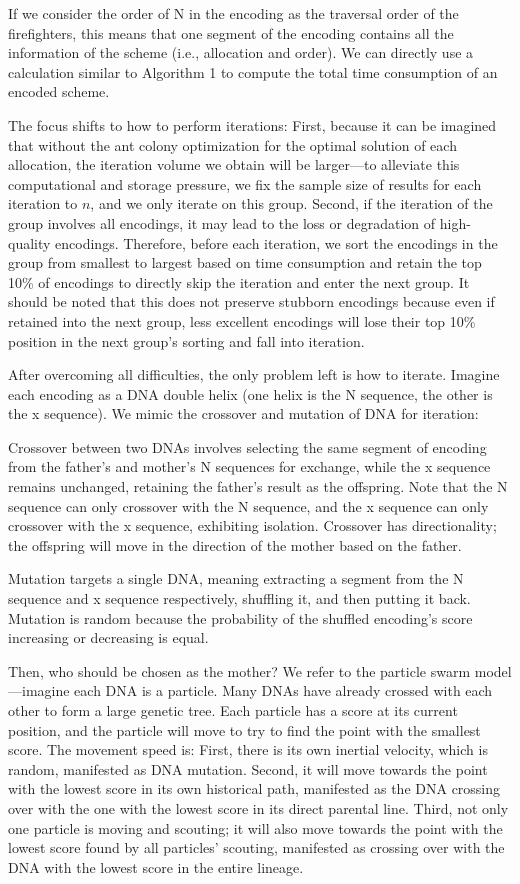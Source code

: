 If we consider the order of N in the encoding as the traversal order of the firefighters, this means that one segment of the encoding contains all the information of the scheme (i.e., allocation and order). We can directly use a calculation similar to Algorithm 1 to compute the total time consumption of an encoded scheme.  

The focus shifts to how to perform iterations: First, because it can be imagined that without the ant colony optimization for the optimal solution of each allocation, the iteration volume we obtain will be larger---to alleviate this computational and storage pressure, we fix the sample size of results for each iteration to $n$, and we only iterate on this group. Second, if the iteration of the group involves all encodings, it may lead to the loss or degradation of high-quality encodings. Therefore, before each iteration, we sort the encodings in the group from smallest to largest based on time consumption and retain the top 10\% of encodings to directly skip the iteration and enter the next group. It should be noted that this does not preserve stubborn encodings because even if retained into the next group, less excellent encodings will lose their top 10\% position in the next group's sorting and fall into iteration.  

After overcoming all difficulties, the only problem left is how to iterate. Imagine each encoding as a DNA double helix (one helix is the N sequence, the other is the x sequence). We mimic the crossover and mutation of DNA for iteration:  

Crossover between two DNAs involves selecting the same segment of encoding from the father's and mother's N sequences for exchange, while the x sequence remains unchanged, retaining the father's result as the offspring. Note that the N sequence can only crossover with the N sequence, and the x sequence can only crossover with the x sequence, exhibiting isolation. Crossover has directionality; the offspring will move in the direction of the mother based on the father.  

Mutation targets a single DNA, meaning extracting a segment from the N sequence and x sequence respectively, shuffling it, and then putting it back. Mutation is random because the probability of the shuffled encoding's score increasing or decreasing is equal.  

Then, who should be chosen as the mother? We refer to the particle swarm model---imagine each DNA is a particle. Many DNAs have already crossed with each other to form a large genetic tree. Each particle has a score at its current position, and the particle will move to try to find the point with the smallest score. The movement speed is: First, there is its own inertial velocity, which is random, manifested as DNA mutation. Second, it will move towards the point with the lowest score in its own historical path, manifested as the DNA crossing over with the one with the lowest score in its direct parental line. Third, not only one particle is moving and scouting; it will also move towards the point with the lowest score found by all particles' scouting, manifested as crossing over with the DNA with the lowest score in the entire lineage.  

